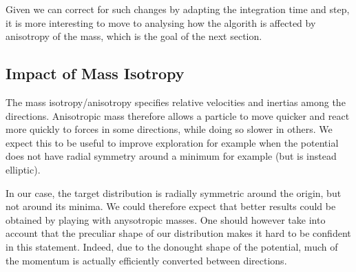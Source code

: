 \documentclass[a4paper, 12pt,oneside]{article}
\begin{document}
			Given we can correct for such changes by adapting the integration time and step, it is more interesting to move to analysing how the algorith is affected by anisotropy of the mass, which is the goal of the next section. 
			\subsection{Impact of Mass Isotropy}
			The mass isotropy/anisotropy specifies relative velocities and inertias among the directions. Anisotropic mass therefore allows a particle to move quicker and react more quickly to forces in some directions, while doing so slower in others. We expect this to be useful to improve exploration for example when the potential does not have radial symmetry around a minimum for example (but is instead elliptic). 

			In our case, the target distribution is radially symmetric around the origin, but not around its minima. We could therefore expect that better results could be obtained by playing with anysotropic masses. One should however take into account that the preculiar shape of our distribution makes it hard to be confident in this statement.
			Indeed, due to the donought shape of the potential, much of the momentum is actually efficiently converted between directions. 
\end{document}
